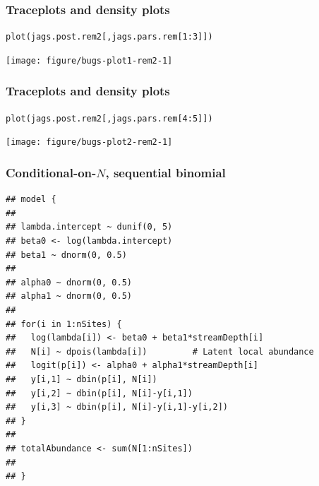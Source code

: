 \documentclass[color=usenames,dvipsnames]{beamer}\usepackage[]{graphicx}\usepackage[]{color}
\makeatletter
\newcommand{\hlnum}[1]{\textcolor[rgb]{0.69,0.494,0}{#1}}%
\newcommand{\hlopt}[1]{\textcolor[rgb]{0,0,0}{#1}}%
\newcommand{\hlstd}[1]{\textcolor[rgb]{0,0,0}{#1}}%
\newcommand{\hlkwd}[1]{\textcolor[rgb]{0.004,0.004,0.506}{#1}}%
\newenvironment{kframe}{%
 \def\at@end@of@kframe{}%
 \ifinner\ifhmode%
  \def\at@end@of@kframe{\end{minipage}}%
  \begin{minipage}{\columnwidth}%
 \fi\fi%
 \def\FrameCommand##1{\hskip\@totalleftmargin \hskip-\fboxsep
 \colorbox{shadecolor}{##1}\hskip-\fboxsep
     \hskip-\linewidth \hskip-\@totalleftmargin \hskip\columnwidth}%
 \MakeFramed {\advance\hsize-\width
   \@totalleftmargin\z@ \linewidth\hsize
   \@setminipage}}%
 {\par\unskip\endMakeFramed%
 \at@end@of@kframe}
\newenvironment{knitrout}{}{} %
\makeatother
\begin{document}
\begin{frame}[fragile]
  \frametitle{Traceplots and density plots}
\begin{knitrout}\footnotesize
{}\color{fgcolor}\begin{kframe}
\begin{alltt}
\hlkwd{plot}\hlstd{(jags.post.rem2[,jags.pars.rem[}\hlnum{1}\hlopt{:}\hlnum{3}\hlstd{]])}
\end{alltt}
\end{kframe}

{\centering \texttt{[image: figure/bugs-plot1-rem2-1]} 

}



\end{knitrout}
\end{frame}



\begin{frame}[fragile]
  \frametitle{Traceplots and density plots}
\begin{knitrout}\footnotesize
{}\color{fgcolor}\begin{kframe}
\begin{alltt}
\hlkwd{plot}\hlstd{(jags.post.rem2[,jags.pars.rem[}\hlnum{4}\hlopt{:}\hlnum{5}\hlstd{]])}
\end{alltt}
\end{kframe}

{\centering \texttt{[image: figure/bugs-plot2-rem2-1]} 

}



\end{knitrout}
\end{frame}




\begin{frame}[fragile]
  \frametitle{\normalsize Conditional-on-$N$, sequential binomial}
\begin{knitrout}\scriptsize
{}\color{fgcolor}\begin{kframe}
\begin{verbatim}
## model {
## 
## lambda.intercept ~ dunif(0, 5)
## beta0 <- log(lambda.intercept)
## beta1 ~ dnorm(0, 0.5)
## 
## alpha0 ~ dnorm(0, 0.5)  
## alpha1 ~ dnorm(0, 0.5)
## 
## for(i in 1:nSites) {
##   log(lambda[i]) <- beta0 + beta1*streamDepth[i]
##   N[i] ~ dpois(lambda[i])         # Latent local abundance
##   logit(p[i]) <- alpha0 + alpha1*streamDepth[i]
##   y[i,1] ~ dbin(p[i], N[i])
##   y[i,2] ~ dbin(p[i], N[i]-y[i,1])
##   y[i,3] ~ dbin(p[i], N[i]-y[i,1]-y[i,2])
## }
## 
## totalAbundance <- sum(N[1:nSites])
## 
## }
\end{verbatim}
\end{kframe}
\end{knitrout}
\end{frame}
\end{document}
